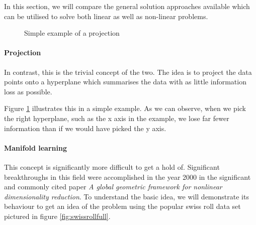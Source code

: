 
In this section, we will compare the general solution approaches available which can be utilised to solve both linear as well as non-linear problems. \cite{HandsOnMLCh8}


\renewcommand{\tikzscale}{0.33}
\begin{figure}
	\vspace*{-8mm}
	\centering
	
	\captionsetup{justification=centering}
	\caption{Simple example of a projection}
    \label{fig:projectionExample}
\end{figure}

\paragraph{Projection} In contrast, this is the trivial concept of the two. The idea is to project the data points onto a \gls{hyperplane} which summarises the data with as little information loss as possible.

Figure \ref{fig:projectionExample} illustrates this in a simple example.
As we can observe, when we pick the right \gls{hyperplane}, such as the x axis in the example, we lose far fewer information than if we would have picked the y axis.


\paragraph{Manifold learning} This concept is significantly more difficult to get a hold of.
Significant breakthroughs \cite{ma2012manifold} in this field were accomplished in the year 2000 in the significant and commonly cited paper \emph{A global geometric framework for nonlinear dimensionality reduction}. \cite{tenenbaum2000global}
To understand the basic idea, we will demonstrate its behaviour to get an idea of the problem using the popular swiss roll data set pictured in figure \ref{fig:swissrollfull}.


